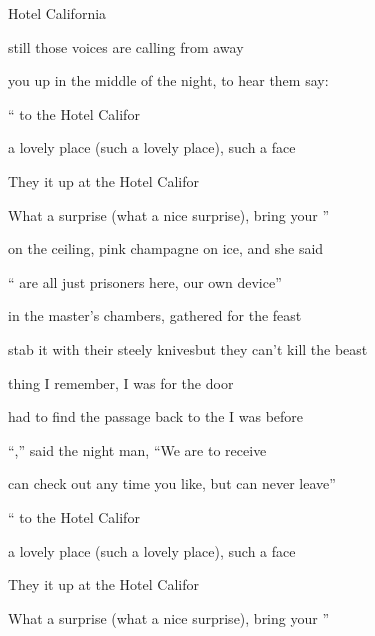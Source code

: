 \begin{SBSong}{Hotel California}
\begin{SBVerse}
     still those voices are calling from  away

     you up in the middle of the night,  to hear them say:
  \end{SBVerse}
  \CBPageBrk
  \begin{SBChorus}
    `` to the Hotel Califor

     a lovely place (such a lovely place), such a  face

    They  it up at the Hotel Califor

    What a  surprise (what a nice surprise), bring your ''
  \end{SBChorus}
  
  \begin{SBVerse}
     on the ceiling,  pink champagne on ice, and she said

    `` are all just prisoners here,  our own device''

     in the master's chambers,  gathered for the feast

     stab it with their steely knives\WBLineBrk but they  can't kill the beast

     thing I remember, I was  for the door

     had to find the passage back to the  I was before

    ``,'' said the night man, ``We are  to receive

     can check out any time you like, but  can never leave''
  \end{SBVerse}
    \begin{SBChorus}
    `` to the Hotel Califor

     a lovely place (such a lovely place), such a  face

    They  it up at the Hotel Califor

    What a  surprise (what a nice surprise), bring your ''  
  \end{SBChorus}
\end{SBSong}
